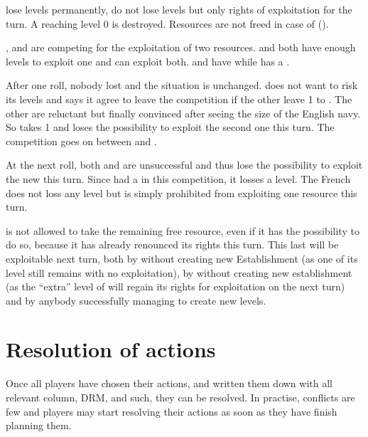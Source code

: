 \bparag \TP lose levels permanently, \COL do not lose levels but only rights
of exploitation for the turn. A \TP reaching level 0 is destroyed.
\bparag Resources are not freed in case of 
().%

\begin{exemple}\HOL, \ENG and \FRA are competing for the exploitation of
  two  resources. \HOL and \FRA both have enough levels to exploit
  one and \ANG can exploit both. \ANG and \HOL have \TP while \FRA has a \COL.

  After one roll, nobody lost and the situation is unchanged. \ANG does not
  want to risk its levels and says it agree to leave the competition if the
  other leave 1  to \ANG. The other are reluctant but finally
  convinced after seeing the size of the English navy. So \ANG takes 1
   and loses the possibility to exploit the second one this
  turn. The competition goes on between \FRA and \HOL.

  At the next roll, both \ANG and \FRA are unsuccessful and thus lose the
  possibility to exploit the new  this turn. Since \HOL had a \TP
  in this competition, it losses a level. The French \COL does not loss any
  level but is simply prohibited from exploiting one resource this turn.

  \ANG is not allowed to take the remaining free resource, even if it has the
  possibility to do so, because it has already renounced its rights this
  turn. This last  will be exploitable next turn, both by \ANG
  without creating new Establishment (as one of its level still remains with
  no exploitation), by \FRA without creating new establishment (as the
  ``extra'' level of \COL will regain its rights for exploitation on the next
  turn) and by anybody successfully managing to create new levels.
\end{exemple}

\section{Resolution of actions}\label{chExpenses:Resolution of actions}
\aparag Once all players have chosen their actions, and written them down with
all relevant column, DRM, and such, they can be resolved.
\bparag In practise, conflicts are few and players may start resolving their
actions as soon as they have finish planning them.

